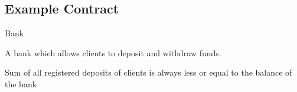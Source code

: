 \documentclass[aspectratio=169]{beamer}
\begin{document}
\subsection{Example Contract}
\begin{frame}{Bank}
\begin{tcolorbox}[colback=white,colframe=red!4,title=\textcolor{red}{Specification:}]
\begin{center} 
A bank which allows clients to deposit and withdraw funds.
\end{center}
\end{tcolorbox} 
%
\begin{tcolorbox}[colback=white,colframe=red!4,title=\textcolor{red}{Property:}]
\begin{center} 
Sum of all registered deposits of clients is always less or equal to the balance of the bank
\end{center}
\end{tcolorbox} 
\end{frame}
%
\end{document}
